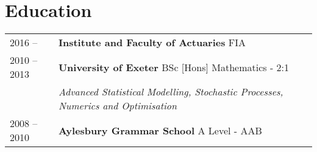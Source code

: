 \documentclass[11pt]{article}
\begin{document}
\section*{Education}
\begin{tabular}{l | l l}
2016 --  & \textbf{Institute and Faculty of Actuaries} FIA \\
2010 -- 2013 & \textbf{University of Exeter} BSc [Hons] Mathematics - 2:1\\
& \hspace{4mm} \textit{Advanced Statistical Modelling, Stochastic Processes, Numerics and Optimisation }\\
2008 -- 2010 & \textbf{Aylesbury Grammar School} A Level - AAB \\
\end{tabular}
\end{document}
